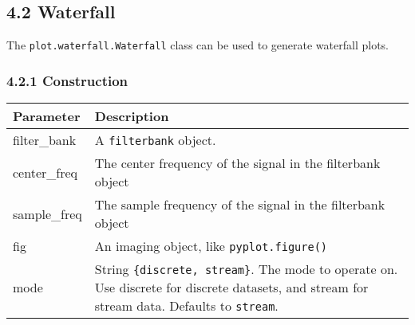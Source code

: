 \documentclass[]{article}
\begin{document}
\subsection{4.2 Waterfall}\label{waterfall}

The \texttt{plot.waterfall.Waterfall} class can be used to generate
waterfall plots.

\subsubsection{4.2.1 Construction}\label{construction}

\begin{longtable}[]{@{}ll@{}}
\toprule
\begin{minipage}[b]{0.15\columnwidth}\raggedright\strut
Parameter\strut
\end{minipage} & \begin{minipage}[b]{0.80\columnwidth}\raggedright\strut
Description\strut
\end{minipage}\tabularnewline
\midrule
\endhead
\begin{minipage}[t]{0.15\columnwidth}\raggedright\strut
filter\_bank\strut
\end{minipage} & \begin{minipage}[t]{0.80\columnwidth}\raggedright\strut
A \texttt{filterbank} object.\strut
\end{minipage}\tabularnewline
\begin{minipage}[t]{0.15\columnwidth}\raggedright\strut
center\_freq\strut
\end{minipage} & \begin{minipage}[t]{0.80\columnwidth}\raggedright\strut
The center frequency of the signal in the filterbank object\strut
\end{minipage}\tabularnewline
\begin{minipage}[t]{0.15\columnwidth}\raggedright\strut
sample\_freq\strut
\end{minipage} & \begin{minipage}[t]{0.80\columnwidth}\raggedright\strut
The sample frequency of the signal in the filterbank object\strut
\end{minipage}\tabularnewline
\begin{minipage}[t]{0.15\columnwidth}\raggedright\strut
fig\strut
\end{minipage} & \begin{minipage}[t]{0.80\columnwidth}\raggedright\strut
An imaging object, like \texttt{pyplot.figure()}\strut
\end{minipage}\tabularnewline
\begin{minipage}[t]{0.15\columnwidth}\raggedright\strut
mode\strut
\end{minipage} & \begin{minipage}[t]{0.80\columnwidth}\raggedright\strut
String \texttt{\{discrete,\ stream\}}. The mode to operate on. Use
discrete for discrete datasets, and stream for stream data. Defaults to
\texttt{stream}.\strut
\end{minipage}\tabularnewline
\bottomrule
\end{longtable}
\end{document}
